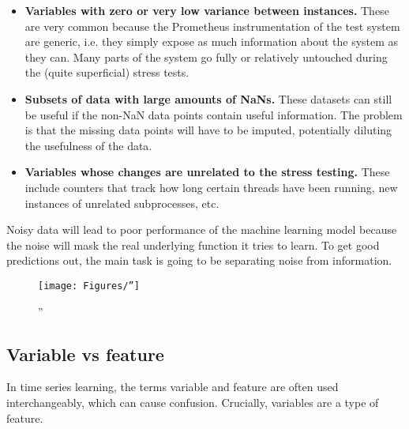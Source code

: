 \begin{itemize}
    \item \textbf{Variables with zero or very low variance between instances.} These are very common because the Prometheus instrumentation of the test system are generic, i.e. they simply expose as much information about the system as they can. Many parts of the system go fully or relatively untouched during the (quite superficial) stress tests.
    \item \textbf{Subsets of data with large amounts of NaNs.} These datasets can still be useful if the non-NaN data points contain useful information. The problem is that the missing data points will have to be imputed, potentially diluting the usefulness of the data. 
    \item \textbf{Variables whose changes are unrelated to the stress testing.} These include counters that track how long certain threads have been running, new instances of unrelated subprocesses, etc. 
\end{itemize}

Noisy data will lead to poor performance of the machine learning model because the noise will mask the real underlying function it tries to learn. To get good predictions out, the main task is going to be separating noise from information. 

\begin{figure} 
\centering 
\texttt{[image: Figures/'']}
\decoRule 
\caption{''}
\end{figure}

\subsection{Variable vs feature}
In time series learning, the terms variable and feature are often used interchangeably, which can cause confusion. 
Crucially, variables are a type of feature. 
